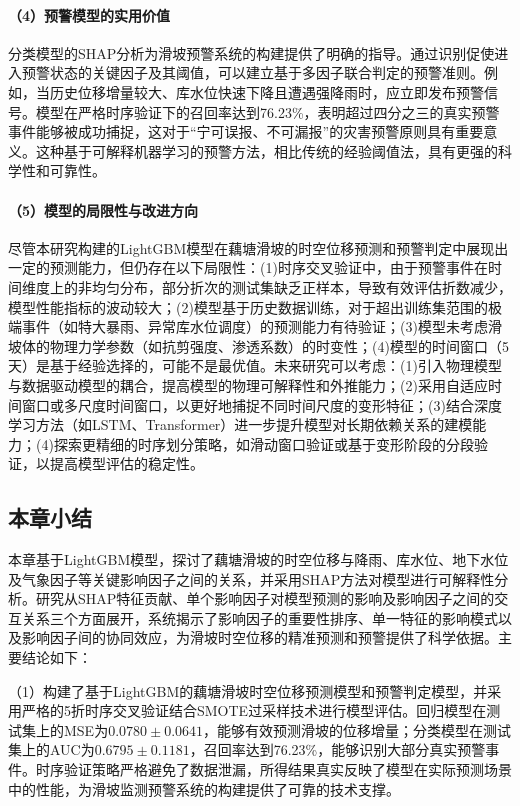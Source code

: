 \documentclass[12pt,a4paper]{article}
\begin{document}
\paragraph{\textbf{（4）预警模型的实用价值}}

分类模型的SHAP分析为滑坡预警系统的构建提供了明确的指导。通过识别促使进入预警状态的关键因子及其阈值，可以建立基于多因子联合判定的预警准则。例如，当历史位移增量较大、库水位快速下降且遭遇强降雨时，应立即发布预警信号。模型在严格时序验证下的召回率达到76.23\%，表明超过四分之三的真实预警事件能够被成功捕捉，这对于“宁可误报、不可漏报”的灾害预警原则具有重要意义。这种基于可解释机器学习的预警方法，相比传统的经验阈值法，具有更强的科学性和可靠性。

\paragraph{\textbf{（5）模型的局限性与改进方向}}

尽管本研究构建的LightGBM模型在藕塘滑坡的时空位移预测和预警判定中展现出一定的预测能力，但仍存在以下局限性：(1)时序交叉验证中，由于预警事件在时间维度上的非均匀分布，部分折次的测试集缺乏正样本，导致有效评估折数减少，模型性能指标的波动较大；(2)模型基于历史数据训练，对于超出训练集范围的极端事件（如特大暴雨、异常库水位调度）的预测能力有待验证；(3)模型未考虑滑坡体的物理力学参数（如抗剪强度、渗透系数）的时变性；(4)模型的时间窗口（5天）是基于经验选择的，可能不是最优值。未来研究可以考虑：(1)引入物理模型与数据驱动模型的耦合，提高模型的物理可解释性和外推能力；(2)采用自适应时间窗口或多尺度时间窗口，以更好地捕捉不同时间尺度的变形特征；(3)结合深度学习方法（如LSTM、Transformer）进一步提升模型对长期依赖关系的建模能力；(4)探索更精细的时序划分策略，如滑动窗口验证或基于变形阶段的分段验证，以提高模型评估的稳定性。

\subsection{本章小结}

本章基于LightGBM模型，探讨了藕塘滑坡的时空位移与降雨、库水位、地下水位及气象因子等关键影响因子之间的关系，并采用SHAP方法对模型进行可解释性分析。研究从SHAP特征贡献、单个影响因子对模型预测的影响及影响因子之间的交互关系三个方面展开，系统揭示了影响因子的重要性排序、单一特征的影响模式以及影响因子间的协同效应，为滑坡时空位移的精准预测和预警提供了科学依据。主要结论如下：

    （1）构建了基于LightGBM的藕塘滑坡时空位移预测模型和预警判定模型，并采用严格的5折时序交叉验证结合SMOTE过采样技术进行模型评估。回归模型在测试集上的MSE为$0.0780 \pm 0.0641$，能够有效预测滑坡的位移增量；分类模型在测试集上的AUC为$0.6795 \pm 0.1181$，召回率达到76.23\%，能够识别大部分真实预警事件。时序验证策略严格避免了数据泄漏，所得结果真实反映了模型在实际预测场景中的性能，为滑坡监测预警系统的构建提供了可靠的技术支撑。
\end{document}
